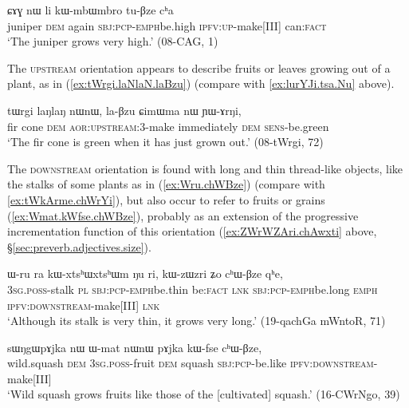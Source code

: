 \begin{exe}
\ex \label{ex:kWmbWmbro.tuBze}
\gll ɕɤɣ nɯ li kɯ-mbɯ\redp{}mbro tu-βze cʰa \\
juniper \textsc{dem} again \textsc{sbj}:\textsc{pcp}-\textsc{emph}\redp{}be.high \textsc{ipfv}:\textsc{up}-make[III] can:\textsc{fact} \\
\glt `The juniper grows very high.' (08-CAG, 1)
 \end{exe}
 
The \textsc{upstream} orientation appears to describe fruits or leaves growing out of a plant, as in (\ref{ex:tWrgi.laNlaN.laBzu})  (compare with \ref{ex:lurYJi.tsa.Nu} above).
 
 \begin{exe}
\ex \label{ex:tWrgi.laNlaN.laBzu}
\gll  tɯrgi laŋlaŋ nɯnɯ, la-βzu ɕimɯma nɯ ɲɯ-ɤrŋi, \\
fir cone \textsc{dem} \textsc{aor}:\textsc{upstream}:3\flobv{}-make immediately \textsc{dem} \textsc{sens}-be.green \\
\glt `The fir cone is green when it has just grown out.' (08-tWrgi, 72)
  \end{exe}

The \textsc{downstream} orientation is found with long and thin thread-like objects, like the stalks of some plants as in (\ref{ex:Wru.chWBze}) (compare with \ref{ex:tWkArme.chWrYi}), but also occur to refer to fruits or grains (\ref{ex:Wmat.kWfse.chWBze}), probably as an extension of the progressive incrementation function of this orientation (\ref{ex:ZWrWZAri.chAwxti} above, §\ref{sec:preverb.adjectives.size}).

  \begin{exe}
\ex \label{ex:Wru.chWBze}
\gll   ɯ-ru ra kɯ-xtsʰɯ\redp{}xtsʰɯm ŋu ri, kɯ-zɯ\redp{}zri ʑo cʰɯ-βze qʰe,  \\
  \textsc{3sg}.\textsc{poss}-stalk \textsc{pl} \textsc{sbj}:\textsc{pcp}-\textsc{emph}\redp{}be.thin be:\textsc{fact} \textsc{lnk}  \textsc{sbj}:\textsc{pcp}-\textsc{emph}\redp{}be.long \textsc{emph} \textsc{ipfv}:\textsc{downstream}-make[III] \textsc{lnk} \\
\glt `Although its stalk is very thin, it grows very long.' (19-qachGa mWntoR, 71)
  \end{exe}
  
\begin{exe}
\ex \label{ex:Wmat.kWfse.chWBze}
\gll    sɯŋgɯpɤjka nɯ ɯ-mat nɯnɯ pɤjka kɯ-fse cʰɯ-βze,    \\
wild.squash \textsc{dem} \textsc{3sg}.\textsc{poss}-fruit \textsc{dem} squash \textsc{sbj}:\textsc{pcp}-be.like \textsc{ipfv}:\textsc{downstream}-make[III] \\
\glt `Wild squash grows fruits like those of the [cultivated] squash.' (16-CWrNgo, 39)
\end{exe}

